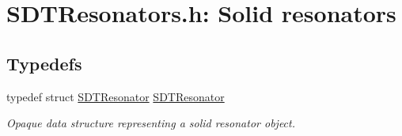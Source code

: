 \hypertarget{group__resonators}{}\section{S\+D\+T\+Resonators.\+h\+: Solid resonators}
\label{group__resonators}
\subsection*{Typedefs}
\begin{DoxyCompactItemize}
\item 
\hypertarget{group__resonators_ga07d183de45e9713277c8f62d93d9be9c}{}typedef struct \hyperlink{group__resonators_ga07d183de45e9713277c8f62d93d9be9c}{S\+D\+T\+Resonator} \hyperlink{group__resonators_ga07d183de45e9713277c8f62d93d9be9c}{S\+D\+T\+Resonator}\label{group__resonators_ga07d183de45e9713277c8f62d93d9be9c}

\begin{DoxyCompactList}\small\item\em Opaque data structure representing a solid resonator object. \end{DoxyCompactList}\end{DoxyCompactItemize}
